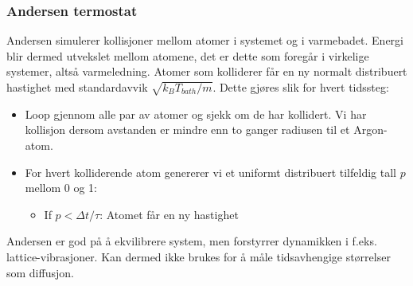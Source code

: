\documentclass[english, a4paper]{article}
\begin{document}
\subsubsection{Andersen termostat}
Andersen simulerer kollisjoner mellom atomer i systemet og i varmebadet. Energi blir dermed
utvekslet mellom atomene, det er dette som foregår i virkelige systemer, altså varmeledning.
Atomer som kolliderer
får en ny normalt distribuert hastighet med standardavvik $\sqrt{k_BT_{bath}/m}$. 
Dette gjøres slik for hvert tidssteg:
\begin{itemize}
 \item Loop gjennom alle par av atomer og sjekk om de har kollidert. Vi har kollisjon
       dersom avstanden er mindre enn to ganger radiusen til et Argon-atom.
 \item For hvert kolliderende atom genererer vi et uniformt distribuert tilfeldig tall $p$ mellom 
       0 og 1:
       \begin{itemize}
       \item If $p < \Delta t/\tau$: Atomet får en ny hastighet
       \end{itemize}
\end{itemize}
Andersen er god på å ekvilibrere system, men forstyrrer dynamikken i f.eks. lattice-vibrasjoner. 
Kan dermed ikke brukes for å måle tidsavhengige størrelser som diffusjon. \\
\end{document}
